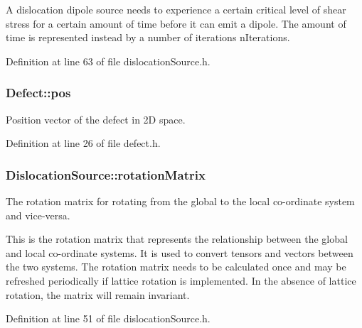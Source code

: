 \-A dislocation dipole source needs to experience a certain critical level of shear stress for a certain amount of time before it can emit a dipole. \-The amount of time is represented instead by a number of iterations n\-Iterations. 

\-Definition at line 63 of file dislocation\-Source.\-h.

\hypertarget{classDefect_aed2731c1beefc22e3db6ad5b18194cdd}{
\subsubsection[{pos}]{ {\bf \-Defect\-::pos}}}\label{d5/d4f/classDefect_aed2731c1beefc22e3db6ad5b18194cdd}


\-Position vector of the defect in 2\-D space. 



\-Definition at line 26 of file defect.\-h.

\hypertarget{classDislocationSource_a3bb826a0646d5c5546045cbf8d523b4f}{
\subsubsection[{rotation\-Matrix}]{ {\bf \-Dislocation\-Source\-::rotation\-Matrix}}}\label{de/de3/classDislocationSource_a3bb826a0646d5c5546045cbf8d523b4f}


\-The rotation matrix for rotating from the global to the local co-\/ordinate system and vice-\/versa. 

\-This is the rotation matrix that represents the relationship between the global and local co-\/ordinate systems. \-It is used to convert tensors and vectors between the two systems. \-The rotation matrix needs to be calculated once and may be refreshed periodically if lattice rotation is implemented. \-In the absence of lattice rotation, the matrix will remain invariant. 

\-Definition at line 51 of file dislocation\-Source.\-h.

